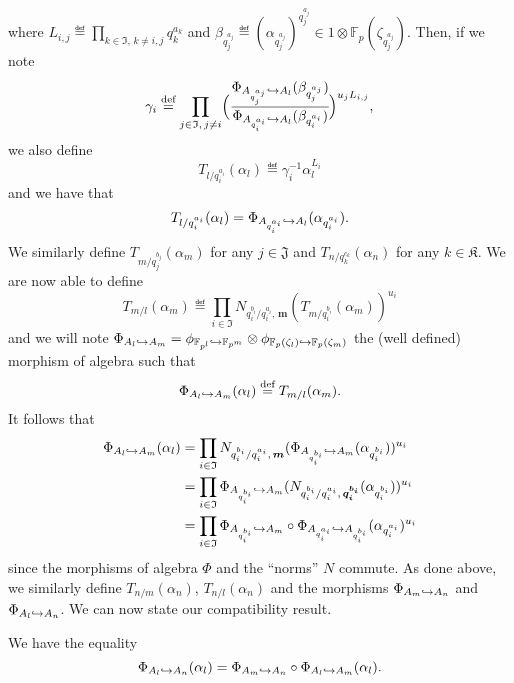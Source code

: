 \documentclass[a4paper,11pt]{article}
\begin{document}
where $L_{i, j}\eqdef\prod_{k\in\mathfrak I,\, k\neq i, j}q_k^{a_k}$ and
$\beta_{q_j^{a_j}}\eqdef
(\alpha_{q_j^{a_j}})^{q_j^{a_j}}\in1\otimes\mathbb{F}_{p}(\zeta_{q_j^{a_j}})$.
Then, if we note
\[
  \gamma_{i} \overset{\text{def}}{=} \prod_{j\in\mathfrak I,\,j\neq i}\Bigl(\cfrac{\Phi_{A_{q_j^{a_j}}\hookrightarrow
A_l}(\beta_{q_j^{a_j}})}{\Phi_{A_{q_i^{a_i}}\hookrightarrow
A_l}(\beta_{q_i^{a_i}})}\Bigr)^{u_jL_{i,j}},
\]
we also define
\[
  T_{l/q_i^{a_i}}(\alpha_l)\eqdef \gamma_i^{-1}\alpha_l^{L_i}
\]
and we have that
\[
  T_{l/q_i^{a_i}}(\alpha_l)=\Phi_{A_{q_i^{a_i}}\hookrightarrow
  A_{l}}(\alpha_{q_i^{a_i}}).
\]
We similarly define $T_{m/q_j^{b_j}}(\alpha_m)$ for any $j\in\mathfrak J$ and
$T_{n/q_k^{c_k}}(\alpha_n)$ for any $k\in\mathfrak K$. We are now able to define
\[
  T_{m/l}(\alpha_m) \eqdef\prod_{i\in\mathfrak
  I}N_{q_i^{b_i}/q_i^{a_i},\,\bm{m}}(T_{m/q_i^{b_i}}(\alpha_m))^{u_i}
\]
and we will note $\Phi_{A_l\hookrightarrow
A_m}=\phi_{\mathbb{F}_{p^l}\hookrightarrow\mathbb{F}_{p^m}}\otimes\phi_{\mathbb{F}_{p}(\zeta_l)\hookrightarrow\mathbb{F}_p(\zeta_m)}$ the (well defined) morphism of algebra
such that
\[
  \Phi_{A_l\hookrightarrow A_m}(\alpha_l) \overset{\text{def}}{=} T_{m/l}(\alpha_m).
\]
It follows that
\begin{align*}
  \Phi_{A_l\hookrightarrow A_m}(\alpha_l) &= \prod_{i\in\mathfrak
  I}N_{q_i^{b_i}/q_i^{a_i},\,\bm{m}}(\Phi_{A_{q_i^{b_i}}\hookrightarrow
A_m}(\alpha_{q_i^{b_i}}))^{u_i}\\
&= \prod_{i\in\mathfrak I}\Phi_{A_{q_i^{b_i}}\hookrightarrow
A_m}(N_{q_i^{b_i}/q_i^{a_i},\,\bm{q_i^{b_i}}}(\alpha_{q_i^{b_i}}))^{u_i}\\
&= \prod_{i\in\mathfrak I}\Phi_{A_{q_i^{b_i}}\hookrightarrow
A_m}\circ\Phi_{A_{q_i^{a_i}}\hookrightarrow A_{q_i^{b_i}}}(\alpha_{q_i^{a_i}})^{u_i}
\end{align*}
since the morphisms of algebra $\Phi$ and the ``norms'' $N$ commute. As done
above, we similarly define $T_{n/m}(\alpha_n)$, $T_{n/l}(\alpha_n)$ and the
morphisms $\Phi_{A_m\hookrightarrow A_n}$ and $\Phi_{A_l\hookrightarrow A_n}$. We can now state our
compatibility result.
\begin{prop}
We have the equality
\[
  \Phi_{A_l\hookrightarrow A_n}(\alpha_l) = \Phi_{A_m\hookrightarrow A_n}\circ\Phi_{A_l\hookrightarrow
  A_m}(\alpha_l).
\]
\end{prop}
\end{document}
